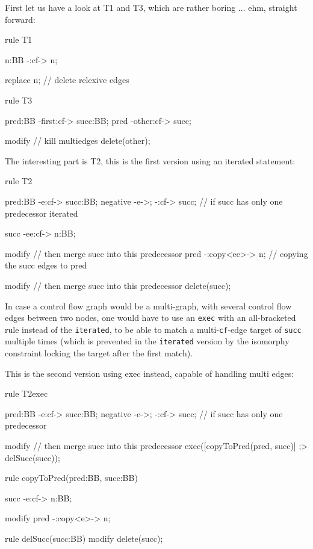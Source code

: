 First let us have a look at T1 and T3, which are rather boring ... ehm, straight forward:

  \begin{example}
    \begin{grgen}
rule T1
{
  n:BB -:cf-> n;

  replace {
    n; // delete relexive edges
  }
}

rule T3
{
  pred:BB -first:cf-> succ:BB;
  pred    -other:cf-> succ;

  modify { // kill multiedges
    delete(other);
  }
}
    \end{grgen}
  \end{example}

The interesting part is T2, this is the first version using an iterated statement:

  \begin{example}
    \begin{grgen}
rule T2
{
  pred:BB -e:cf-> succ:BB;
  negative {
    -e->;
    -:cf-> succ; // if succ has only one predecessor
  }
  iterated {
    succ -ee:cf-> n:BB;

    modify { // then merge succ into this predecessor
      pred -:copy<ee>-> n; // copying the succ edges to pred
    }
  }

  modify { // then merge succ into this predecessor
    delete(succ);
  }
}
    \end{grgen}
  \end{example}

In case a control flow graph would be a multi-graph, with several control flow edges between two nodes, one would have to use an \texttt{exec} with an all-bracketed rule instead of the \texttt{iterated}, to be able to match a multi-\texttt{cf}-edge target of \texttt{succ} multiple times (which is prevented in the \texttt{iterated} version by the isomorphy constraint locking the target after the first match).

This is the second version using exec instead, capable of handling multi edges:

  \begin{example}
    \begin{grgen}
rule T2exec
{
  pred:BB -e:cf-> succ:BB;
  negative {
    -e->;
    -:cf-> succ; // if succ has only one predecessor
  }

  modify { // then merge succ into this predecessor
    exec([copyToPred(pred, succ)] ;> delSucc(succ));
  }
}

rule copyToPred(pred:BB, succ:BB)
{
  succ -e:cf-> n:BB;

  modify {
    pred -:copy<e>-> n;
  }
}

rule delSucc(succ:BB)
{
  modify {
    delete(succ);
  }
}
    \end{grgen}
  \end{example}

